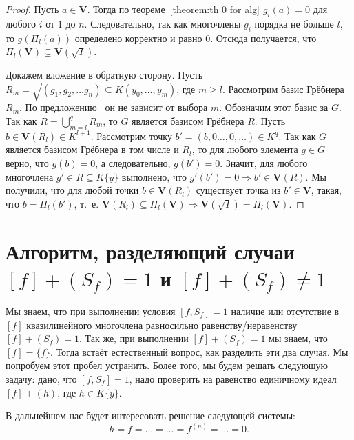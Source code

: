 \documentclass[16pt]{article}
\newcommand{\orange}[1]{{\color{orange}#1}}
\theoremstyle{plain}
\theoremstyle{definition}
\theoremstyle{remark}
\begin{document}
\begin{proof}
Пусть $a\in \mathbf{V}$.
Тогда по теореме~\ref{theorem:th 0 for alg} $g_i(a)=0$ для любого $i$ от $1$ до $n$. Следовательно, так как многочлены $g_i$  порядка не больше $l$, то $g(\Pi_l(a))$ определено корректно и равно 0. Отсюда получается, что $\Pi_l(\mathbf{V})\subseteq\mathbf{V}(\sqrt{I})$.

Докажем вложение в обратную сторону. Пусть $R_m=\sqrt{(g_1,g_2,\ldots g_n)}\subseteq K(y_0,\ldots,y_m)$, где $m\geq l$. Рассмотрим базис Грёбнера $R_m$. По предложению~\cite[Chapter~IV, Section~2, Suggestion~8]{Cox} он не зависит от выбора $m$.
Обозначим этот базис за $G$. Так как $R=\bigcup\limits_{m=l}^{q}R_m$, то $G$ является базисом Грёбнера $R$.
Пусть $b\in\mathbf{V}(R_l)\in K^{l+1}$.
Рассмотрим точку $b'=(b,0\ldots,0,\ldots)\in K^{q}$. Так как $G$ является базисом Грёбнера в том числе и $R_l$, то для любого элемента $g\in G$ верно, что $g(b)=0$, а следовательно, $g(b')=0$.
Значит, для любого многочлена $g'\in R\subseteq K\{y\}$ выполнено, что $g'(b')=0\Rightarrow b'\in\mathbf{V}(R)$. Мы получили, что для любой точки $b\in\mathbf{V}(R_l)$ существует точка из $b'\in\mathbf{V}$, такая, что $b=\Pi_l(b')$, т.~е. $\mathbf{V}(R_l)\subseteq\Pi_l(\mathbf{V})\Rightarrow \mathbf{V}(\sqrt{I})=\Pi_l(\mathbf{V})$. 
\end{proof}

\section{Алгоритм, разделяющий случаи $[f]+(S_f)=1$ и $[f]+(S_f)\neq1$}

Мы знаем, что при выполнении условия $[f,S_f]=1$ наличие или отсутствие в $[f]$ квазилинейного многочлена равносильно равенству/неравенству $[f]+(S_f)=1$. Так же, при выполнении $[f]+(S_f)=1$ мы знаем, что $[f]=\{f\}$. Тогда встаёт естественный вопрос, как разделить эти два случая. Мы попробуем этот пробел устранить. Более того, мы будем решать следующую задачу: дано, что $[f,S_f]=1$, надо проверить на равенство единичному идеал $[f]+(h)$, где $h\in K\{y\}$.

В дальнейшем нас будет интересовать решение следующей системы:
\begin{equation}h=f=\ldots=\ldots=f^{(n)}=\ldots=0. \end{equation}
\end{document}
